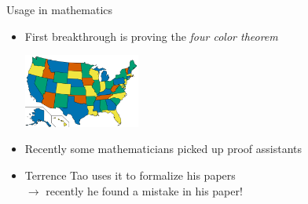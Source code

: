 \documentclass[compress,12pt,xcolor={dvipsnames}]{beamer}
\begin{document}
\begin{frame}{Usage in mathematics}
    \begin{itemize}
        \item First breakthrough is proving the \textit{four color theorem}
              \begin{center} \includegraphics[width=0.3\textwidth]{map_coloring.png} \end{center}
        \item Recently some mathematicians picked up proof assistants
        \item Terrence Tao uses it to formalize his papers \\
              $\to$ recently he found a mistake in his paper!
    \end{itemize}
\end{frame}


\end{document}

